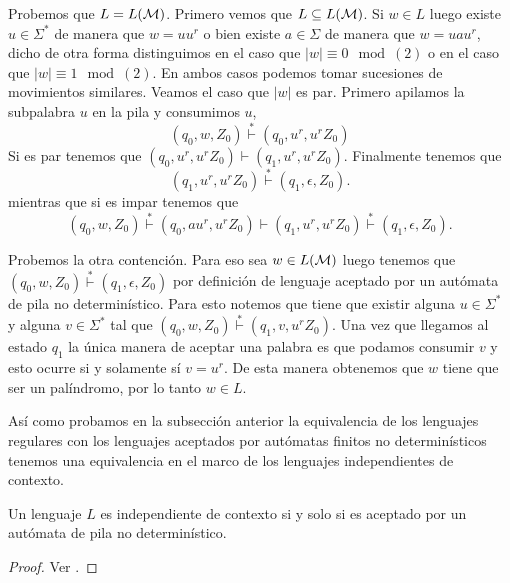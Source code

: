\documentclass[tesis.tex]{subfiles}
\begin{document}
\begin{ej}
	
	Probemos que $L = L(\cal M)$.
	Primero vemos que $L \subseteq L(\cal M)$.
	Si $w \in L$ luego existe $u \in \Sigma^{*}$ de manera que $w = uu^r$ o bien existe $a \in \Sigma$ de manera que $w = uau^r$, dicho de otra forma distinguimos en el caso que $|w| \equiv 0 \mod (2)$ o en el caso que $|w| \equiv 1 \mod (2)$.
	En ambos casos podemos tomar sucesiones de movimientos similares.
	Veamos el caso que $|w|$ es par.
	Primero apilamos la subpalabra $u$ en la pila y consumimos $u$,
	\[
		(q_{0}, w, Z_{0}) \overset{*}{\vdash} (q_{0},u^r,u^rZ_{0})
	\]
	Si es par tenemos que $(q_{0},u^r,u^rZ_{0}) \vdash (q_{1},u^r,u^rZ_{0})$.
	Finalmente tenemos que 
	\[
		(q_{1},u^r,u^rZ_{0}) \overset{*}{\vdash} (q_{1},\epsilon,Z_{0}).
	\] 
	mientras que si es impar tenemos que 
	\[
		(q_{0}, w, Z_{0}) \overset{*}{\vdash} (q_{0},au^r,u^rZ_{0}) \vdash (q_{1},u^r,u^rZ_{0})\overset{*}{\vdash} (q_{1},\epsilon,Z_{0}).
	\] 	
	
	Probemos la otra contención.
	Para eso sea $w \in L(\cal M)$ luego tenemos que $(q_{0},w,Z_{0}) \overset{*}{\vdash} (q_{1},\epsilon,Z_{0})$ por definición de lenguaje aceptado por un autómata de pila no determinístico.
	Para esto notemos que tiene que existir alguna $u \in \Sigma^*$ y alguna $v \in \Sigma^{*}$ tal que $(q_{0}, w, Z_{0}) \overset{*}{\vdash} (q_{1},v,u^rZ_{0})$.
	Una vez que llegamos al estado $q_{1}$ la única manera de aceptar una palabra es que podamos consumir $v$ y esto ocurre si y solamente sí $v = u^r$.
	De esta manera obtenemos que $w$ tiene que ser un palíndromo, por lo tanto $w \in L$.
	
	
\end{ej}

Así como probamos en la subsección anterior la equivalencia de los lenguajes regulares con los lenguajes aceptados por autómatas finitos no determinísticos tenemos una equivalencia en el marco de los lenguajes independientes de contexto.

\medskip

\begin{teo}\label{teo_ic_apnd}
	Un lenguaje $L$ es independiente de contexto si y solo si es aceptado por un autómata de pila no determinístico.
\end{teo}

\begin{proof}
	Ver \cite{hopcraft-ullman}.
\end{proof}
\end{document}
